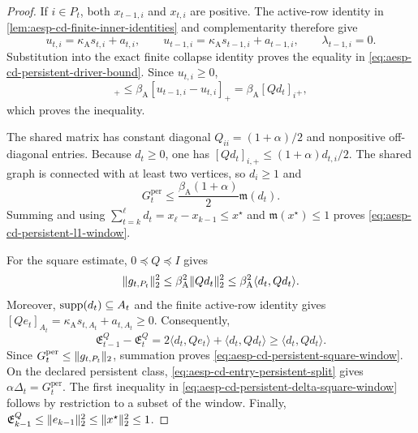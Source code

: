 \begin{proof}
If $i\in P_t$, both $x_{t-1,i}$ and $x_{t,i}$ are positive.  The active-row
identity in \cref{lem:aesp-cd-finite-inner-identities} and complementarity
therefore give
\begin{equation*}
 u_{t,i}=\kappa_{\mathrm A}s_{t,i}+a_{t,i},
 \qquad
 u_{t-1,i}=\kappa_{\mathrm A}s_{t-1,i}+a_{t-1,i},
 \qquad
 \lambda_{t-1,i}=0.
\end{equation*}
Substitution into the exact finite collapse identity proves the equality in
\cref{eq:aesp-cd-persistent-driver-bound}.  Since $u_{t,i}\geq0$,
\begin{equation*}
 [\beta_{\mathrm A}u_{t-1,i}
   -(1+\beta_{\mathrm A})u_{t,i}]_+
 \leq\beta_{\mathrm A}[u_{t-1,i}-u_{t,i}]_+
 =\beta_{\mathrm A}[Qd_t]_i{}_+,
\end{equation*}
which proves the inequality.

The shared matrix has constant diagonal
$Q_{ii}=(1+\alpha)/2$ and nonpositive off-diagonal entries.  Because
$d_t\geq0$, one has
$[Qd_t]_{i,+}\leq(1+\alpha)d_{t,i}/2$.  The shared graph is connected with
at least two vertices, so
$d_i\geq1$ and
\begin{equation*}
 G_t^{\mathrm{per}}
 \leq\frac{\beta_{\mathrm A}(1+\alpha)}2
       \mathfrak m(d_t).
\end{equation*}
Summing and using
$\sum_{t=k}^{\ell}d_t=x_\ell-x_{k-1}\leq x^\star$ and
$\mathfrak m(x^\star)\leq1$ proves
\cref{eq:aesp-cd-persistent-l1-window}.

For the square estimate, $0\preceq Q\preceq I$ gives
\begin{equation*}
 \lVert g_{t,P_t}\rVert_2^2
 \leq\beta_{\mathrm A}^2\lVert Qd_t\rVert_2^2
 \leq\beta_{\mathrm A}^2\langle d_t,Qd_t\rangle.
\end{equation*}
Moreover, $\operatorname{supp}(d_t)\subseteq A_t$ and the finite active-row identity gives
$[Qe_t]_{A_t}=\kappa_{\mathrm A}s_{t,A_t}+a_{t,A_t}\geq0$.  Consequently,
\begin{equation}
 \mathfrak E_{t-1}^Q-\mathfrak E_t^Q
 =2\langle d_t,Qe_t\rangle+\langle d_t,Qd_t\rangle
 \geq\langle d_t,Qd_t\rangle.
 \label{eq:aesp-cd-q-energy-drop}
\end{equation}
Since $G_t^{\mathrm{per}}\leq\lVert g_{t,P_t}\rVert_2$, summation proves
\cref{eq:aesp-cd-persistent-square-window}.  On the declared persistent
class, \cref{eq:aesp-cd-entry-persistent-split} gives
$\alpha\Delta_t=G_t^{\mathrm{per}}$.  The first inequality in
\cref{eq:aesp-cd-persistent-delta-square-window} follows by restriction to a
subset of the window.  Finally,
$\mathfrak E_{k-1}^Q\leq\lVert e_{k-1}\rVert_2^2\leq\lVert x^\star\rVert_2^2\leq1$.
\end{proof}

